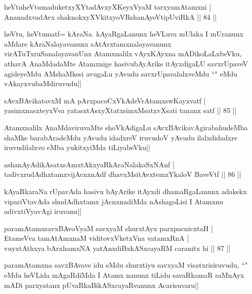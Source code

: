 \begin{shl}
heVtuheVtumaduketxyXYtadAvxyXKeyxVyaM tarxyamAtamxni |\\
AnanadxvadAvx shaknokxyXVkitxyoVR\s shanAyeVtipUviRkA \hfill || 84 ||
\end{shl}

\begin{artha}
heVtu, heVtumatf= kAraNa. kAyaRgaLanunx heVLuva mUlaka I mUranunx aMdare kAraNalayavanunx sAtArxtamxnalayavanunx virATuTxruSanalayavanUnx Atamxnalilx vAyxKAyxna mADikoLaLxbeVku, athavA AnaMdadaMte Atamxnige hasivubAyArike itAyxdigaLU savxrUpaveV agideyeMdu AMshaMkesi avugaLu yAvudu savxrUpavalalxveMdu ``\stext " eMdu vAkayxvubaMdiruvudu||
\end{artha}

\begin{shl}
sAvxBAvikatavxM mA pArxpacoCxVkAdeVrAtamxswKayxvatf |\\
yasimxnasxteyxVva yatasxtAsxyXtatxsimxMsatxvXsati tananx satf \hfill || 85 ||
\end{shl}

\begin{artha}%
Atamxnalilx AnaMdaviruvaMte shoVkAdigaLu sAvxBAvikavAgirabahudeMba shaMke barabAradeMdu yAvudu idadxreV iruvudoV yAvudu ilalxdidadxre iruvudilalxvo eMba yukitxyiMda tiLiyabeVku||
\end{artha}

\begin{shl}
ashanAyAdikAsatxsAmxtAkxyaRkAraNalakaSxNAnf |\\
tadivxrudAdhxtamxvijAcnxnAdf dhavxMsitAvx\s \s temxYkaloV BaveVtf \hfill || 86 ||
\end{shl}

\begin{artha}
kAyaRkaraNa rUpavAda hasivu bAyArike itAyxdi dhamaRgaLanunx adakekx vipariVtavAda shudAdhxtamx jAcnxnadiMda nAshagoLisi I Atamxnu adivxtiVyavAgi iruvanu||
\end{artha}

\begin{shl}
paramAtamxsavxBAvoV\s yaM savxyaM shurxtAyx parxpacnicxtaH |\\
EtameVva tamAtAmxnaM viditovxVketxVna vatamxRnA |\\
vuyxtAthxya bArxhamxNA yatAnxdiBxkASxcayaRM caranitx hi \hfill || 87 ||
\end{shl}

\begin{artha}
paramAtamxna savxBAvave idu eMdu shurxtiyu savxyaM visatxrisiruvudu, ``\stext" eMdu heVLida mAgaRdiMda I Atamx nanunx tiLidu savaRkamaR saMnAyx mADi parxyatanx pUvaRkaBikASxcayaRvanunx Acarisuvaru||
\end{artha}

